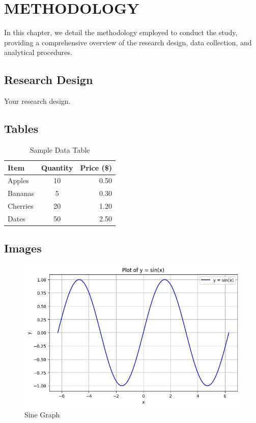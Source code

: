 \chapter{METHODOLOGY}
{\baselineskip
	
	In this chapter, we detail the methodology employed to conduct the study, providing a comprehensive overview of the research design, data collection, and analytical procedures.
	
	\section{Research Design}
	Your research design.
	
	\section{Tables}
	
	\begin{table}[ht]
		\centering
		\caption{Sample Data Table}
		\label{tab:sample}
		\begin{tabular}{l c r}
			\toprule
			\textbf{Item} & \textbf{Quantity} & \textbf{Price (\$)} \\
			\midrule
			Apples & 10 & 0.50 \\
			Bananas & 5 & 0.30 \\
			Cherries & 20 & 1.20 \\
			Dates & 50 & 2.50 \\
			\bottomrule
		\end{tabular}
	\end{table}
	
	\section{Images}
	\begin{figure}
		\centering
		\includegraphics[width=0.7\linewidth]{figures/sinegraph}
		\caption{Sine Graph}
		\label{fig:sinegraph}
	\end{figure}
	
}
